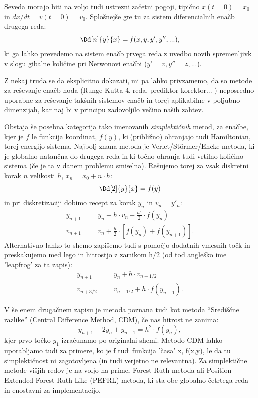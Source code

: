 \documentclass{article}
\begin{document}
Seveda morajo biti na voljo tudi ustrezni začetni pogoji, tipično
$x(t=0)=x_0$ in $dx/dt=v(t=0)=v_0$. Splošnejše gre tu za sistem diferencialnih
enačb drugega reda:
\[
\Dd[n]{y}{x} = f(x,y,y',y'',...),
\]
ki ga lahko prevedemo na sistem enačb prvega reda z uvedbo novih spremenljivk v slogu
gibalne količine pri Netwonovi enačbi ($y'=v,y''=z,...$).

Z nekaj truda se da eksplicitno dokazati, mi pa lahko privzamemo, da so metode za
reševanje enačb hoda (Runge-Kutta 4. reda, prediktor-korektor... ) neposredno uporabne
za reševanje takšnih sistemov enačb in torej aplikabilne v poljubno dimenzijah, kar
naj bi v principu zadovoljilo večino naših zahtev.

Obstaja še posebna kategorija tako imenovanih \emph{simplektičnih} metod, za enačbe, kjer je $f$ le funkcija koordinat, $f(y)$, ki (približno) ohranjajo tudi Hamiltonian,
torej energijo sistema. Najbolj znana metoda je Verlet/St\"ormer/Encke metoda, ki je globalno
natančna do drugega reda in ki točno ohranja tudi vrtilno količino sistema (če je ta v danem problemu smiselna). Rešujemo torej za vsak diskretni korak $n$ velikosti $h$, $x_n=x_0+n \cdot h$:
\[
\Dd[2]{y}{x} = f(y)
\]
in pri diskretizaciji dobimo recept za korak $y_n$ in $v_n=y'_n$:
\begin{eqnarray*}
y_{n+1} &=& y_n + h \cdot v_n + \frac{h^2}{2} \cdot f(y_n) \\
v_{n+1} &=& v_n +  \frac{h}{2} \cdot \left[ f(y_n) + f(y_{n+1}) \right].
\end{eqnarray*}
Alternativno lahko to shemo zapišemo tudi s pomočjo dodatnih vmesnih točk in preskakujemo med lego in hitrostjo z zamikom h/2 (od tod angleško ime 'leapfrog' za ta zapis):
\begin{eqnarray*}
y_{n+1} &=& y_n + h \cdot v_{n+1/2} \\
v_{n+3/2} &=& v_{n+1/2} + h \cdot f(y_{n+1}).
\end{eqnarray*}


V še enem drugačnem zapisu je metoda poznana tudi kot metoda ``Središčne razlike'' (Central Difference Method, CDM), če nas hitrost ne zanima:
\[
y_{n+1} - 2 y_n + y_{n-1} = h^2 \cdot f(y_n),
\]
kjer prvo točko $y_1$ izračunamo po originalni shemi. Metodo CDM lahko uporabljamo tudi
za primere, ko je f tudi funkcija 'časa' x, f(x,y), le da tu simplektičnost ni zagotovljena
(in tudi verjetno ne relevantna).
Za simplektične metode višjih redov je na voljo na primer Forest-Ruth metoda ali Position
Extended Forest-Ruth Like (PEFRL) metoda, ki sta obe globalno četrtega reda in enostavni za
implementacijo.
\newpage
\end{document}
